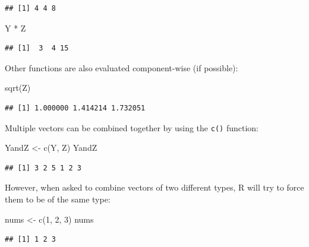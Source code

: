 \documentclass[
]{book}
\newenvironment{Shaded}{\begin{snugshade}}{\end{snugshade}}
\newcommand{\DecValTok}[1]{\textcolor[rgb]{0.00,0.00,0.81}{#1}}
\newcommand{\FunctionTok}[1]{\textcolor[rgb]{0.00,0.00,0.00}{#1}}
\newcommand{\NormalTok}[1]{#1}
\newcommand{\OtherTok}[1]{\textcolor[rgb]{0.56,0.35,0.01}{#1}}
\newcommand{\SpecialCharTok}[1]{\textcolor[rgb]{0.00,0.00,0.00}{#1}}
\begin{document}
\begin{verbatim}
## [1] 4 4 8
\end{verbatim}

\begin{Shaded}
\begin{Highlighting}[]
\NormalTok{Y }\SpecialCharTok{*}\NormalTok{ Z}
\end{Highlighting}
\end{Shaded}

\begin{verbatim}
## [1]  3  4 15
\end{verbatim}

Other functions are also evaluated component-wise (if possible):

\begin{Shaded}
\begin{Highlighting}[]
\FunctionTok{sqrt}\NormalTok{(Z)}
\end{Highlighting}
\end{Shaded}

\begin{verbatim}
## [1] 1.000000 1.414214 1.732051
\end{verbatim}

Multiple vectors can be combined together by using the \texttt{c()} function:

\begin{Shaded}
\begin{Highlighting}[]
\NormalTok{YandZ }\OtherTok{\textless{}{-}} \FunctionTok{c}\NormalTok{(Y, Z)}
\NormalTok{YandZ}
\end{Highlighting}
\end{Shaded}

\begin{verbatim}
## [1] 3 2 5 1 2 3
\end{verbatim}

However, when asked to combine vectors of two different types, R will try to force them to be of the same type:

\begin{Shaded}
\begin{Highlighting}[]
\NormalTok{nums }\OtherTok{\textless{}{-}} \FunctionTok{c}\NormalTok{(}\DecValTok{1}\NormalTok{, }\DecValTok{2}\NormalTok{, }\DecValTok{3}\NormalTok{)}
\NormalTok{nums}
\end{Highlighting}
\end{Shaded}

\begin{verbatim}
## [1] 1 2 3
\end{verbatim}
\end{document}
